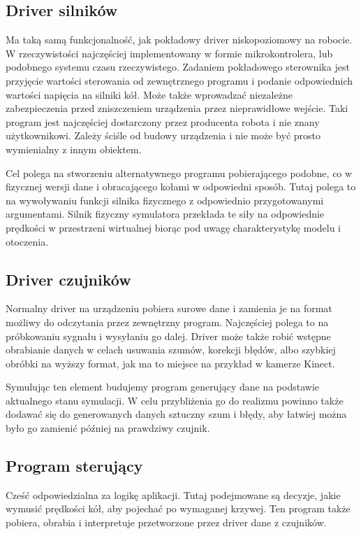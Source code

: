  \subsection{Driver silników}
 Ma taką samą funkcjonalność, jak pokładowy driver niskopoziomowy na robocie.
 W rzeczywistości najczęściej implementowany w formie mikrokontrolera, lub podobnego systemu czasu rzeczywistego.
 Zadaniem pokładowego sterownika jest przyjęcie wartości sterowania od zewnętrznego programu i podanie odpowiednich wartości napięcia na silniki kół.
 Może także wprowadzać niezależne zabezpieczenia przed zniszczeniem urządzenia przez nieprawidłowe wejście.
 Taki program jest najczęściej dostarczony przez producenta robota i nie znany użytkownikowi.
 Zależy ściśle od budowy urządzenia i nie może być prosto wymienialny z innym obiektem.
 
 Cel polega na stworzeniu alternatywnego programu pobierającego podobne, co w fizycznej wersji dane i obracającego kołami w odpowiedni sposób.
 Tutaj polega to na wywoływaniu funkcji silnika fizycznego z odpowiednio przygotowanymi argumentami.
 Silnik fizyczny symulatora przekłada te siły na odpowiednie prędkości w przestrzeni wirtualnej biorąc pod uwagę charakterystykę modelu i otoczenia.
 
 \subsection{Driver czujników}
 Normalny driver na urządzeniu pobiera surowe dane i zamienia je na format możliwy do odczytania przez zewnętrzny program.
 Najczęściej polega to na próbkowaniu sygnału i wysyłaniu go dalej.
 Driver może także robić wstępne obrabianie danych w celach usuwania szumów, korekcji błędów, albo szybkiej obróbki na wyższy format, jak ma to miejsce na przykład w kamerze Kinect.
 
 Symulując ten element budujemy program generujący dane na podstawie aktualnego stanu symulacji. 
 W celu przybliżenia go do realizmu powinno także dodawać się do generowanych danych sztuczny szum i błędy, aby łatwiej można było go zamienić później na prawdziwy czujnik.
 
\subsection{Program sterujący}
 Cześć odpowiedzialna za logikę aplikacji. Tutaj podejmowane są decyzje, jakie wymusić prędkości kół, aby pojechać po wymaganej krzywej.
 Ten program także pobiera, obrabia i interpretuje przetworzone przez driver dane z czujników.
 
